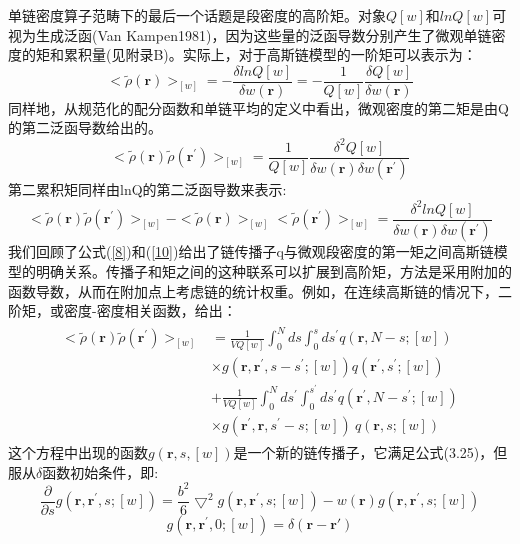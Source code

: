 单链密度算子范畴下的最后一个话题是段密度的高阶矩。对象$Q[w]$和$ln Q[w]$可视为生成泛函(Van Kampen1981)，因为这些量的泛函导数分别产生了微观单链密度的矩和累积量(见附录B)。实际上，对于高斯链模型的一阶矩可以表示为：
\begin{equation}\label{25}
<\tilde{\rho}(\mathbf{r})>_{[w]}=-\frac{\delta lnQ[w]}{\delta w(\mathbf{r})}=-\frac{1}{Q[w]}\frac{\delta Q[w]}{\delta w(\mathbf{r})}
\end{equation}
同样地，从规范化的配分函数和单链平均的定义中看出，微观密度的第二矩是由Q的第二泛函导数给出的。
\begin{equation}\label{26}
<\tilde{\rho}(\mathbf{r})\tilde{\rho}(\mathbf{r}^{'})>_{[w]}=\frac{1}{Q[w]}\frac{\delta^2 Q[w]}{\delta w(\mathbf{r})\delta  w(\mathbf{r}^{'})}
\end{equation}
第二累积矩同样由lnQ的第二泛函导数来表示:
\begin{equation}\label{27}
<\tilde{\rho}(\mathbf{r})\tilde{\rho}(\mathbf{r}^{'})>_{[w]}-<\tilde{\rho}(\mathbf{r})>_{[w]}<\tilde{\rho}(\mathbf{r}^{'})>_{[w]}=\frac{\delta^2 lnQ[w]}{\delta w(\mathbf{r})\delta w(\mathbf{r}^{'})}
\end{equation}
我们回顾了公式(\ref{8})和(\ref{10})给出了链传播子q与微观段密度的第一矩之间高斯链模型的明确关系。传播子和矩之间的这种联系可以扩展到高阶矩，方法是采用附加的函数导数，从而在附加点上考虑链的统计权重。例如，在连续高斯链的情况下，二阶矩，或密度-密度相关函数，给出：
\begin{align}\label{28}
\begin{split}
<\tilde{\rho}(\mathbf{r})\tilde{\rho}(\mathbf{r}^{'})>_{[w]}&=\frac{1}{VQ[w]}\int_{0}^{N}ds \int_{0}^{s}ds^{'}q(\mathbf{r},N-s;[w])\\&\times g(\mathbf{r},\mathbf{r}^{'},s-s^{'};[w])q(\mathbf{r}^{'},s^{'};[w])\\&+\frac{1}{VQ[w]}\int_{0}^{N}ds^{'} \int_{0}^{s^{'}}ds^{'}q(\mathbf{r}^{'},N-s^{'};[w])\\&\times g(\mathbf{r}^{'},\mathbf{r},s^{'}-s;[w])~q(\mathbf{r},s;[w])
\end{split}
\end{align}
这个方程中出现的函数$g(\mathbf{r},s,[w])$是一个新的链传播子，它满足公式(3.25)，但服从$\delta$函数初始条件，即:
\begin{equation}\label{29}
\frac{\partial}{\partial s}g(\mathbf{r},\mathbf{r}^{'},s;[w])=\frac{b^2}{6}\bigtriangledown^2g(\mathbf{r},\mathbf{r}^{'},s;[w])-w(\mathbf{r})g(\mathbf{r},\mathbf{r}^{'},s;[w])
\end{equation}
\begin{equation}\label{30}
g(\mathbf{r},\mathbf{r}^{'},0;[w])=\delta(\mathbf{r}-\mathbf{r}{'})
\end{equation}
